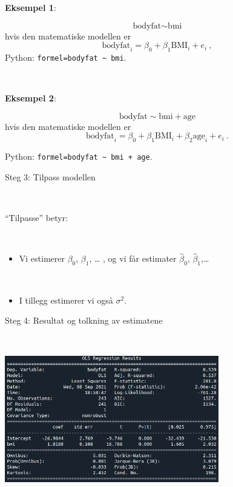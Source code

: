 \documentclass[10pt,ignorenonframetext,]{beamer}
\providecommand{\tightlist}{%
  \setlength{\itemsep}{0pt}\setlength{\parskip}{0pt}}
\begin{document}
\begin{frame}[fragile]

\textbf{Eksempel 1}:

\[\text{bodyfat} \sim \text{bmi} \] hvis den matematiske modellen er
\[\text{bodyfat}_i = \beta_0 + \beta_1 \text{BMI}_i + e_i \ , \] Python:
\texttt{formel=\textquotesingle{}bodyfat\ \textasciitilde{}\ bmi\textquotesingle{}}.

\(~\)

\textbf{Eksempel 2}:

\[\text{bodyfat} \sim \text{bmi} + \text{age}\] hvis den matematiske
modellen er
\[\text{bodyfat}_i = \beta_0 + \beta_1 \text{BMI}_i + \beta_2 \text{age}_i + e_i \ . \]

Python:
\texttt{formel=\textquotesingle{}bodyfat\ \textasciitilde{}\ bmi\ +\ age\textquotesingle{}}.

\end{frame}

\begin{frame}

\begin{block}{Steg 3: Tilpass modellen}

\(~\)

``Tilpasse'' betyr:

\(~\)

\begin{itemize}
\tightlist
\item
  Vi estimerer \(\beta_0\), \(\beta_1\), \ldots{} , og vi får estimater
  \(\hat\beta_0\), \(\hat\beta_1\),\ldots{}
\end{itemize}

\(~\)

\begin{itemize}
\tightlist
\item
  I tillegg estimerer vi også \(\sigma^2\).
\end{itemize}

\end{block}

\end{frame}

\begin{frame}

\begin{block}{Steg 4: Resultat og tolkning av estimatene}

\(~\)

\includegraphics[width=0.7\textwidth,height=\textheight]{ols_result.png}

\vspace{20mm}

\end{block}

\end{frame}
\end{document}
